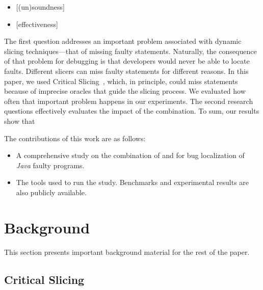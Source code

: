 \documentclass{article}
\begin{document}
\begin{itemize}[leftmargin=*]
\item[]{\footnotesize[(un)soundness]}~\textit{\rqone{}}
\item[]{\footnotesize[effectiveness]}~\textit{\rqthree{}}
\end{itemize}

The first question addresses an important problem associated with
dynamic slicing techniques---that of missing faulty
statements. Naturally, the consequence of that problem for debugging
is that developers would never be able to locate faults. Different
slicers can miss faulty statements for different reasons. In this
paper, we used Critical Slicing~\cite{DeMillo:1996:CSS:229000.226310},
which, in principle, could miss statements because of imprecise
oracles that guide the slicing process. We evaluated how often that
important problem happens in our experiments. The second research
questions effectively evaluates the impact of the combination. To sum,
our results show that 

The contributions of this work are as follows:
\begin{itemize}
	\item A comprehensive study on the combination of \sfl{} and \ds{}
     for bug localization of \emph{Java} faulty programs.
	\item The tools used to run the study. Benchmarks and experimental results are also publicly available.
\end{itemize}

\section{Background}
\label{sec:background}

This section presents important background material for the rest of the paper.

\subsection{Critical Slicing}
\label{sec:slicing}

\end{document}
